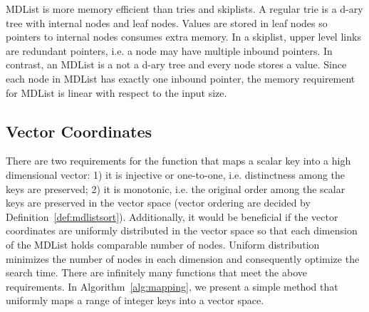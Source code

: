 \documentclass[10pt,journal,letterpaper,compsoc]{IEEEtran}
\begin{document}
MDList is more memory efficient than tries and skiplists.
A regular trie is a d-ary tree with internal nodes and leaf nodes. 
Values are stored in leaf nodes so pointers to internal nodes consumes extra memory.
In a skiplist, upper level links are redundant pointers, i.e. a node may have multiple inbound pointers.
In contrast, an MDList is a not a d-ary tree and every node stores a value.
Since each node in MDList has exactly one inbound pointer, the memory requirement for MDList is linear with respect to the input size.


\subsection{Vector Coordinates}
\label{sec:coord}
There are two requirements for the function that maps a scalar key into a high dimensional vector: 1) it is injective or one-to-one, i.e. distinctness among the keys are preserved; 2) it is monotonic, i.e. the original order among the scalar keys are preserved in the vector space (vector ordering are decided by Definition~\ref{def:mdlistsort}).
Additionally, it would be beneficial if the vector coordinates are uniformly distributed in the vector space so that each dimension of the MDList holds comparable number of nodes. 
Uniform distribution minimizes the number of nodes in each dimension and consequently optimize the search time.
There are infinitely many functions that meet the above requirements.
In Algorithm~\ref{alg:mapping}, we present a simple method that uniformly maps a range of integer keys into a vector space.
\end{document}
